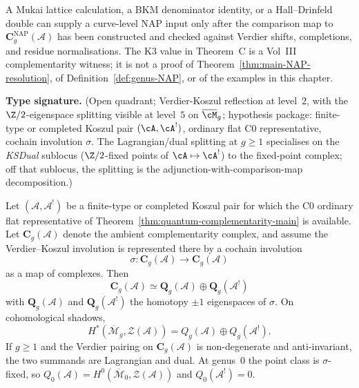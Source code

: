 \begin{remark}
\label{rem:k3-bkm-hall-comparison-map}
A Mukai lattice calculation, a BKM denominator identity, or a
Hall--Drinfeld double can supply a curve-level NAP input only after
the comparison map to $\mathbf{C}^{\mathrm{NAP}}_g(\mathcal{A})$ has
been constructed and checked against Verdier shifts, completions, and
residue normalisations. The K3 value in Theorem~C is a
Vol~III complementarity witness; it is not a proof of
Theorem~\ref{thm:main-NAP-resolution}, of
Definition~\ref{def:genus-NAP}, or of the examples in this chapter.
\end{remark}

\begin{theorem}\label{thm:genus-complementarity}
\textbf{Type signature.} (Open quadrant; Verdier-Koszul reflection at
level~$2$, with the $\Z/2$-eigenspace splitting visible at level~$5$
on $\overline{\cM}_g$; hypothesis package: finite-type or completed
Koszul pair $(\cA,\cA^!)$, ordinary flat C0 representative, cochain
involution $\sigma$. The Lagrangian/dual splitting at $g\geq1$
specialises on the \emph{KSDual} sublocus
\textup{(}$\Z/2$-fixed points of $\cA\mapsto\cA^!$\textup{)} to the
fixed-point complex; off that sublocus, the splitting is the
adjunction-with-comparison-map decomposition.)

Let $(\mathcal{A},\mathcal{A}^!)$ be a finite-type or completed
Koszul pair for which the C0 ordinary flat representative of
Theorem~\ref{thm:quantum-complementarity-main} is available. Let
$\mathbf{C}_g(\mathcal{A})$ denote the ambient complementarity complex,
and assume the
Verdier--Koszul involution is represented there by a cochain
involution
\[
\sigma\colon \mathbf{C}_g(\mathcal{A})\to \mathbf{C}_g(\mathcal{A})
\]
as a map of complexes. Then
\[
\mathbf{C}_g(\mathcal{A})
\simeq
\mathbf{Q}_g(\mathcal{A})\oplus \mathbf{Q}_g(\mathcal{A}^!)
\]
with $\mathbf{Q}_g(\mathcal{A})$ and
$\mathbf{Q}_g(\mathcal{A}^!)$ the homotopy $\pm1$ eigenspaces of
$\sigma$. On cohomological shadows,
\[
H^*(\overline{\mathcal{M}}_g,\mathcal{Z}(\mathcal{A}))
=
Q_g(\mathcal{A})\oplus Q_g(\mathcal{A}^!).
\]
If $g\geq1$ and the Verdier pairing on
$\mathbf{C}_g(\mathcal{A})$ is non-degenerate and anti-invariant,
the two summands are Lagrangian and dual. At genus~$0$ the point
class is $\sigma$-fixed, so
$Q_0(\mathcal{A})=H^0(\overline{\mathcal{M}}_0,\mathcal{Z}(\mathcal{A}))$
and $Q_0(\mathcal{A}^!)=0$.
\end{theorem}

